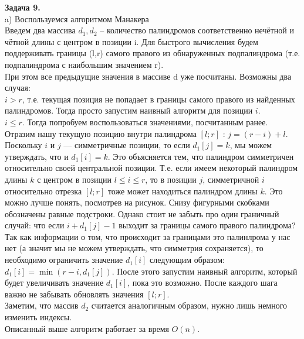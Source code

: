\documentclass[12pt,a4paper]{scrartcl}
\begin{document}
	\textbf{Задача 9.} \\
	
	a) Воспользуемся алгоритмом Манакера\\
	Введем два массива $d_1, d_2$ -- количество палиндромов соответственно нечётной и чётной длины с центром в позиции i.
	Для быстрого вычисления будем поддерживать границы (l,r) самого правого из обнаруженных подпалиндрома (т.е. подпалиндрома с наибольшим значением r). \\
	При этом все предыдущие значения в массиве d уже посчитаны. Возможны два случая:\\
	$i > r$, т.е. текущая позиция не попадает в границы самого правого из найденных палиндромов. Тогда просто запустим наивный алгоритм для позиции $i$.\\
	$i \leqslant r$. Тогда попробуем воспользоваться значениями, посчитанным ранее. Отразим нашу текущую позицию внутри палиндрома $[l;r]$ : $j = (r - i) + l$. Поскольку $i$ и $j$ — симметричные позиции, то если $d_1[j] = k$, мы можем утверждать, что и $d_1[i] = k$. Это объясняется тем, что палиндром симметричен относительно своей центральной позиции. Т.е. если имеем некоторый палиндром длины $k$ с центром в позиции $l \leqslant i \leqslant r$, то в позиции $j$, симметричной $i$ относительно отрезка $[l; r]$ тоже может находиться палиндром длины $k$. Это можно лучше понять, посмотрев на рисунок. Снизу фигурными скобками обозначены равные подстроки. Однако стоит не забыть про один граничный случай: что если $i + d_1[j] - 1$ выходит за границы самого правого палиндрома? Так как информации о том, что происходит за границами это палинлрома у нас нет (а значит мы не можем утверждать, что симметрия сохраняется), то необходимо ограничить значение $d_1[i]$ следующим образом: $d_1[i] = \min(r - i, d_1[j])$. После этого запустим наивный алгоритм, который будет увеличивать значение $d_1[i]$, пока это возможно.
	После каждого шага важно не забывать обновлять значения $[l;r]$.\\
	Заметим, что массив $d_2$ считается аналогичным образом, нужно лишь немного изменить индексы. \\
	Описанный выше алгоритм работает за время $O(n)$.
	
\end{document}
